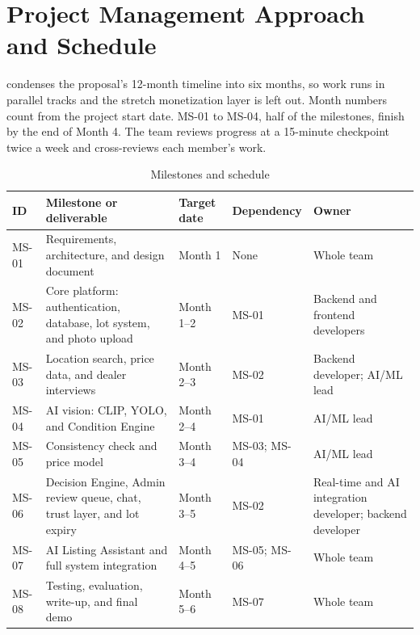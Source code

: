 \section{Project Management Approach and Schedule}
 condenses the proposal's 12-month timeline into six months, so work
runs in parallel tracks and the stretch monetization layer is left out. Month numbers
count from the project start date.
MS-01 to MS-04, half of the milestones, finish by the end of Month 4. The team reviews progress at a
15-minute checkpoint twice a week and cross-reviews each member's work.

\begin{table}[H]
\centering
\caption{Milestones and schedule}
\label{tab:schedule}
\footnotesize
\begin{tabularx}{\textwidth}{@{}>{\raggedright\arraybackslash}p{}>{\raggedright\arraybackslash}X >{\raggedright\arraybackslash}p{}>{\raggedright\arraybackslash}p{}>{\raggedright\arraybackslash}p{}@{}}
\toprule
\textbf{ID} & \textbf{Milestone or deliverable} & \textbf{Target date} & \textbf{Dependency} & \textbf{Owner} \\
\midrule
MS-01 & Requirements, architecture, and design document & Month 1 & None & Whole team \\
MS-02 & Core platform: authentication, database, lot system, and photo upload & Month 1--2 & MS-01 & Backend and frontend developers \\
MS-03 & Location search, price data, and dealer interviews & Month 2--3 & MS-02 & Backend developer; AI/ML lead \\
MS-04 & AI vision: CLIP, YOLO, and Condition Engine & Month 2--4 & MS-01 & AI/ML lead \\
MS-05 & Consistency check and price model & Month 3--4 & MS-03; MS-04 & AI/ML lead \\
MS-06 & Decision Engine, Admin review queue, chat, trust layer, and lot expiry & Month 3--5 & MS-02 & Real-time and AI integration developer; backend developer \\
MS-07 & AI Listing Assistant and full system integration & Month 4--5 & MS-05; MS-06 & Whole team \\
MS-08 & Testing, evaluation, write-up, and final demo & Month 5--6 & MS-07 & Whole team \\
\bottomrule
\end{tabularx}
\end{table}

